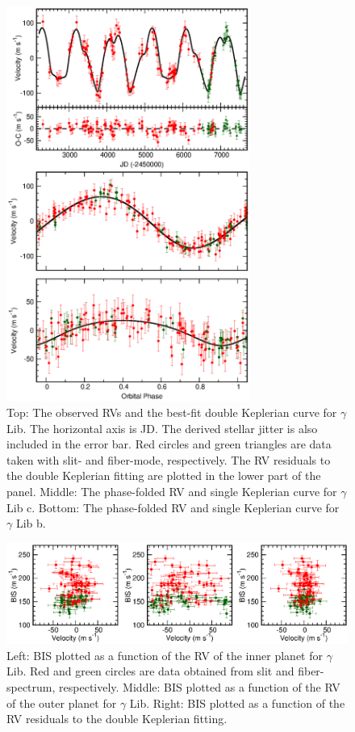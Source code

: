 \documentclass[]{pasj01}
\begin{document}
\begin{figure}
\begin{center}
\includegraphics[width=8cm]{re_rv_resi_phase_138905.v3.eps}
\end{center}
\caption{Top: The observed RVs and the best-fit double Keplerian curve for $\gamma$ Lib. The horizontal axis is JD. The derived stellar jitter is also included in the error bar. Red circles and green triangles are data taken with slit- and fiber-mode, respectively. The RV residuals to the double Keplerian fitting are plotted in the lower part of the panel. Middle: The phase-folded RV and single Keplerian curve for $\gamma$ Lib c. Bottom: The phase-folded RV and single Keplerian curve for $\gamma$ Lib b.}
\label{re_rv_resi_138905}
\end{figure}

\begin{figure}
\begin{center}
\includegraphics[width=14cm]{re_rv_resi_bis_138905.eps}
\end{center}
\caption{Left: BIS plotted as a function of the RV of the inner planet for $\gamma$ Lib. Red and green circles are data obtained from slit and fiber-spectrum, respectively. Middle: BIS plotted as a function of the RV of the outer planet for $\gamma$ Lib. Right: BIS plotted as a function of the RV residuals to the double Keplerian fitting.}
\label{re_rv_resi_bis_138905}
\end{figure}
\end{document}

